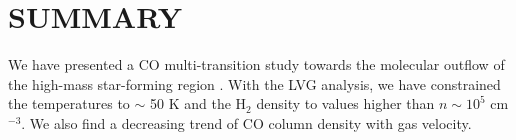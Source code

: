 \section{SUMMARY}\label{summary}

We have presented a CO multi-transition study towards the molecular outflow of the high-mass star-forming region . With the LVG analysis, we have constrained the temperatures to $\sim$ 50 K and the H$_2$ density to values higher than $n \sim 10^5$ cm$^{-3}$. We also find a decreasing trend of CO column density with gas velocity. 